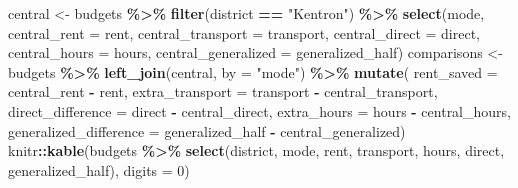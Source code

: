 \documentclass[
]{article}
\newenvironment{Shaded}{\begin{snugshade}}{\end{snugshade}}
\newcommand{\AttributeTok}[1]{\textcolor[rgb]{0.13,0.29,0.53}{#1}}
\newcommand{\DecValTok}[1]{\textcolor[rgb]{0.00,0.00,0.81}{#1}}
\newcommand{\FunctionTok}[1]{\textcolor[rgb]{0.13,0.29,0.53}{\textbf{#1}}}
\newcommand{\NormalTok}[1]{#1}
\newcommand{\OtherTok}[1]{\textcolor[rgb]{0.56,0.35,0.01}{#1}}
\newcommand{\SpecialCharTok}[1]{\textcolor[rgb]{0.81,0.36,0.00}{\textbf{#1}}}
\newcommand{\StringTok}[1]{\textcolor[rgb]{0.31,0.60,0.02}{#1}}
\begin{document}
\begin{Shaded}
\begin{Highlighting}[]
\NormalTok{central }\OtherTok{\textless{}{-}}\NormalTok{ budgets }\SpecialCharTok{\%\textgreater{}\%} \FunctionTok{filter}\NormalTok{(district }\SpecialCharTok{==} \StringTok{"Kentron"}\NormalTok{) }\SpecialCharTok{\%\textgreater{}\%}
  \FunctionTok{select}\NormalTok{(mode, }\AttributeTok{central\_rent =}\NormalTok{ rent, }\AttributeTok{central\_transport =}\NormalTok{ transport,}
         \AttributeTok{central\_direct =}\NormalTok{ direct, }\AttributeTok{central\_hours =}\NormalTok{ hours, }\AttributeTok{central\_generalized =}\NormalTok{ generalized\_half)}
\NormalTok{comparisons }\OtherTok{\textless{}{-}}\NormalTok{ budgets }\SpecialCharTok{\%\textgreater{}\%} \FunctionTok{left\_join}\NormalTok{(central, }\AttributeTok{by =} \StringTok{"mode"}\NormalTok{) }\SpecialCharTok{\%\textgreater{}\%} \FunctionTok{mutate}\NormalTok{(}
  \AttributeTok{rent\_saved =}\NormalTok{ central\_rent }\SpecialCharTok{{-}}\NormalTok{ rent,}
  \AttributeTok{extra\_transport =}\NormalTok{ transport }\SpecialCharTok{{-}}\NormalTok{ central\_transport,}
  \AttributeTok{direct\_difference =}\NormalTok{ direct }\SpecialCharTok{{-}}\NormalTok{ central\_direct,}
  \AttributeTok{extra\_hours =}\NormalTok{ hours }\SpecialCharTok{{-}}\NormalTok{ central\_hours,}
  \AttributeTok{generalized\_difference =}\NormalTok{ generalized\_half }\SpecialCharTok{{-}}\NormalTok{ central\_generalized)}
\NormalTok{knitr}\SpecialCharTok{::}\FunctionTok{kable}\NormalTok{(budgets }\SpecialCharTok{\%\textgreater{}\%} \FunctionTok{select}\NormalTok{(district, mode, rent, transport, hours, direct, generalized\_half), }\AttributeTok{digits =} \DecValTok{0}\NormalTok{)}
\end{Highlighting}
\end{Shaded}
\end{document}
